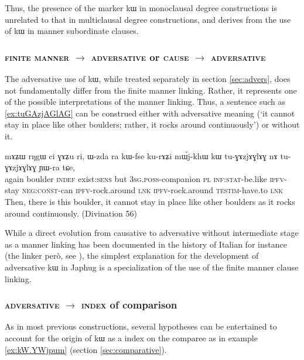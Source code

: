 \documentclass[oldfontcommands,oneside,a4paper,11pt]{article}
\newcommand{\ipa}[1]{{\phon #1}} %
\begin{document}
Thus, the presence of the marker \ipa{kɯ} in monoclausal degree constructions is unrelated to that in multiclausal degree constructions, and derives from the use of \ipa{kɯ} in manner subordinate clauses. 


 
 

 \subsubsection{\textsc{finite manner} $\rightarrow$ \textsc{adversative} or \textsc{cause} $\rightarrow$ \textsc{adversative} }
 
The adversative use of \ipa{kɯ}, while treated separately  in section \ref{sec:advers}, does not fundamentally  differ from the finite manner linking. Rather, it represents one of the possible interpretations of the manner linking. Thus, a sentence such as  \ref{ex:tuGAzjAGlAG} can be construed either with adversative meaning (`it cannot stay in place like other boulders; rather, it rocks around continuously') or without it.
 
 \begin{exe}
\ex \label{ex:tuGAzjAGlAG}
\gll  
    \ipa{mɤʑɯ}  	\ipa{rŋgɯ}  	\ipa{ci}  	\ipa{ɣɤʑu}  	\ipa{ri,}  	\ipa{ɯ-zda}  	\ipa{ra}  	\ipa{kɯ-fse}  	\ipa{ku-rɤʑi}  	\ipa{mɯ́j-khɯ}  	\ipa{kɯ}  	\ipa{tu-ɣɤzjɤɣlɤɣ}  	\ipa{nɤ}  	\ipa{tu-ɣɤzjɤɣlɤɣ}  	\ipa{ɲɯ-ra}  	\ipa{tɕe,}  \\
    again boulder \textsc{indef} exist:\textsc{sens} but \textsc{3sg.poss}-companion \textsc{pl} \textsc{inf:stat}-be.like \textsc{ipfv}-stay \textsc{neg:const}-can \textsc{ipfv}-rock.around \textsc{lnk} \textsc{ipfv}-rock.around  \textsc{testim}-have.to \textsc{lnk}     \\
   \glt Then, there is this boulder, it cannot stay in place like other boulders as it rocks around continuously. (Divination  56)
 \end{exe}
 
 While a direct evolution from causative to adversative without intermediate stage as a manner linking has been documented in the history of Italian for instance (the linker \ipa{però}, see  \citealt{mauri12adversative}), the simplest explanation for the development of adversative \ipa{kɯ} in Japhug is a specialization of the use of the finite manner clause linking.
 
 
 
  \subsubsection{\textsc{adversative} $\rightarrow$ \textsc{index} of comparison}
  As in most previous constructions, several hypotheses can be entertained to account for the origin of \ipa{kɯ} as a index on the comparee as in example \ref{ex:kW.YWjpum}  (section \ref{sec:comparative}).
  
\end{document}
